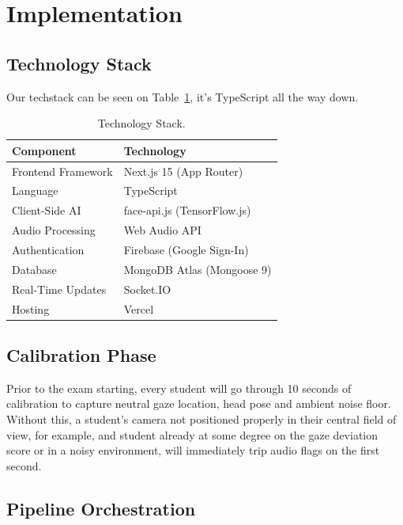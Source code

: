 \documentclass[runningheads]{llncs}
\begin{document}
\section{Implementation}\label{sec:impl}

\subsection{Technology Stack}

Our techstack can be seen on Table~\ref{tab:techstack}, it's TypeScript all the way down.

\begin{table}[htbp]
\caption{Technology Stack.}\label{tab:techstack}
\centering
\begin{tabular}{@{}ll@{}}
\toprule
\textbf{Component} & \textbf{Technology} \\
\midrule
Frontend Framework  & Next.js 15 (App Router) \\
Language            & TypeScript \\
Client-Side AI      & face-api.js (TensorFlow.js) \\
Audio Processing    & Web Audio API \\
Authentication      & Firebase (Google Sign-In) \\
Database            & MongoDB Atlas (Mongoose 9) \\
Real-Time Updates   & Socket.IO \\
Hosting             & Vercel \\
\bottomrule
\end{tabular}
\end{table}

\subsection{Calibration Phase}

Prior to the exam starting, every student will go through 10 seconds of calibration to capture neutral gaze location, head pose and ambient noise floor. Without this, a student's camera not positioned properly in their central field of view, for example, and student already at some degree on the gaze deviation score or in a noisy environment, will immediately trip audio flags on the first second.

\subsection{Pipeline Orchestration}
\end{document}
